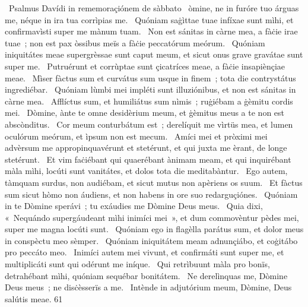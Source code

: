 {~Psalmus Davídi in rememoraçiónem de sàbbato}
{%
~òmine, ne in furóre tuo árguas me, néque in ira tua corrìpias me.
~Quóniam saġìttae tuae infíxae sunt mìhi, et confirmavìsti super me mànum tuam.
~Non est sánitas in càrne mea, a fàċie irae tuae~; non est pax òssibus meïs a fàċie peccatórum meórum.
~Quóniam iniquitátes meae supergrèssae sunt caput meum, et sicut onus grave gravátae sunt super me.
~Putruérunt et corrùptae sunt çicatríces meae, a fàċie insapiènçiae meae.
~Mìser fàctus sum et curvátus sum usque in finem~; tota die contrystátus ingrediébar.
~Quóniam lùmbi mei impléti sunt illuziónibus, et non est sánitas in càrne mea.
~Afflíctus sum, et humiliátus sum nìmis~; ruġiébam a ġèmitu cordis mei.
~Dòmine, ànte te omne desidèrium meum, et ġèmitus meus a te non est abscònditus.
~Cor meum conturbátum est~; derelíquit me vìrtüs mea, et lumen oculórum meórum, et ìpsum non est mecum.
~Amíci mei et pròximi mei advèrsum me appropinquavérunt et stetérunt, et qui juxta me èrant, de longe stetérunt.
~Et vim faċiébant qui quaerébant ànimam meam, et qui inquirébant màla mìhi, locúti sunt vanitátes, et dolos tota die meditabàntur.
~Ego autem, tàmquam surdus, non audiébam, et sicut mutus non apèriens os suum.
~Et fàctus sum sicut hòmo non áudiens, et non habens in ore suo redarguçiónes.
~Quóniam in te Dòmine sperávi~; tu exáudies me Dòmine Deus meus.
~Quia dixi, «~Nequándo supergáudeant mìhi inimíci mei~», et dum commovèntur pèdes mei, super me magna locúti sunt.
~Quóniam ego in flagèlla parátus sum, et dolor meus in conspèctu meo sèmper.
~Quóniam iniquitátem meam adnunçiábo, et coġitábo pro peccáto meo.
~Inimíci autem mei vivunt, et confirmáti sunt super me, et multiplicáti sunt qui odérunt me iníque.
~Qui retrìbuunt màla pro bonïs, detrahébant mìhi, quóniam sequébar bonitátem.
~Ne derelìnquas me, Dòmine Deus meus~; ne disċèsserïs a me.
~Intènde in adjutórium meum, Dòmine, Deus salútis meae.
}
{6}{1}

